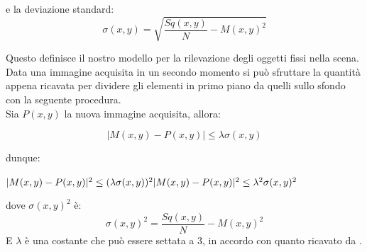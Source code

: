 \documentclass[a4paper,10pt, twocolumn]{article}
\begin{document}
  e la deviazione standard:
  \begin{equation}
   \sigma(x,y) = \sqrt{ \dfrac{Sq(x,y)}{N} - M(x,y)^2}
  \end{equation}
  
  Questo definisce il nostro modello per la rilevazione degli 
  oggetti fissi nella scena. Data una immagine acquisita in un secondo 
  momento si pu\`{o} sfruttare la quantit\`{a} appena ricavata per dividere
  gli elementi in primo piano da quelli sullo sfondo con 
  la seguente procedura.\\
  Sia $P(x,y)$ la nuova immagine acquisita, allora:
  
  \begin{equation}
   | M(x,y) - P(x,y) | \leq \lambda \sigma(x,y)
  \end{equation}
  
  dunque:
  \begin{center}
  $  
   | M(x,y) - P(x,y) |^2 \leq (\lambda \sigma(x,y))^2
    \newline
    \newline
   | M(x,y) - P(x,y) |^2 \leq \lambda^2 \sigma(x,y)^2   
  $ 
  \newline
  
  \end{center}
  dove $\sigma(x,y)^2$ \`{e}:  
  \begin{equation}
  \sigma(x,y)^2 = \dfrac{Sq(x,y)}{N} - M(x,y)^2 
  \end{equation}
  E $\lambda$ \`{e} una costante che pu\`{o} essere settata a 3,
  in accordo con quanto ricavato da \cite{backgroundRemovalDamiles}.
 
 
\end{document}
